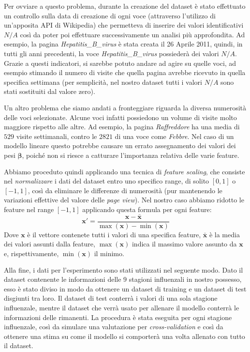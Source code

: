 Per ovviare a questo problema, durante la creazione del dataset è stato effettuato un controllo sulla data di creazione di 
ogni voce (attraverso l'utilizzo di un'apposita API di Wikipedia) che permetteva di inserire dei valori identificativi $N/A
$ così da poter poi effettuare successivamente un analisi più approfondita. Ad esempio, la pagina \textit{Hepatitis_B_virus} 
è stata creata il 26 Aprile 2011, quindi, in tutti gli anni precedenti, la voce \textit{Hepatitis_B_virus} 
possiederà dei valori $N/A$. Grazie a questi indicatori, si sarebbe potuto andare ad agire su quelle voci, ad esempio 
stimando il numero di visite che quella pagina avrebbe ricevuto in quella specifica settimana (per semplicità, nel nostro 
dataset tutti i valori $N/A$ sono stati sostituiti dal valore zero).
\bigskip

Un altro problema che siamo andati a fronteggiare riguarda la diversa numerosità delle voci selezionate. Alcune voci infatti 
possiedono un volume di visite molto maggiore rispetto alle altre. Ad esempio, la pagina \textit{Raffreddore} ha una media di 
$529$ visite settimanali, contro le $2821$ di una voce come \textit{Febbre}. Nel caso di un modello lineare questo potrebbe 
causare un errato assegnamento dei valori dei pesi $\bm{\beta}$, poiché non si riesce a catturare l'importanza relativa delle 
varie feature.
\bigskip

Abbiamo proceduto quindi applicando una tecnica di \textit{feature scaling}, che consiste nel \textit{normalizzare} i dati 
del dataset entro uno specifico range, di solito $[0, 1]$ o $[-1, 1]$, così da eliminare le differenze di numerosità (pur 
mantenendo le variazioni effettive del valore delle \textit{page view}). Nel nostro caso abbiamo ridotto le feature nel range 
$[-1, 1]$ applicando questa formula per ogni feature:
\begin{equation}
\bm{x}' = \frac{\bm{x}-\bar{\bm{x}}}{\max(\bm{x})-\min(\bm{x})}
\end{equation} 
Dove $\bm{x}$ è il vettore contenete tutti i valori di una specifica feature, $\bar{\bm{x}}$ è la media dei valori assunti 
dalla feature, $\max(\bm{x})$ indica il massimo valore assunto da $\bm{x}$ e, rispettivamente, $\min(\bm{x})$ il minimo.
\bigskip

Alla fine, i dati per l'esperimento sono stati utilizzati nel seguente modo. Dato il dataset contenente le informazioni 
delle 9 stagioni influenzali in nostro possesso, esso è stato diviso in modo da ottenere un dataset di training e un dataset 
di test disgiunti tra loro. Il dataset di test conterrà i valori di una sola stagione influenzale, mentre il dataset che 
verrà usato per allenare il modello conterrà le informazioni delle rimanenti. La procedura è stata eseguita 
per ogni stagione influenzale, così da simulare una valutazione per \textit{cross-validation} e così da ottenere una stima su 
come il modello si comporterà una volta allenato con tutto il dataset.
\bigskip
\newpage
